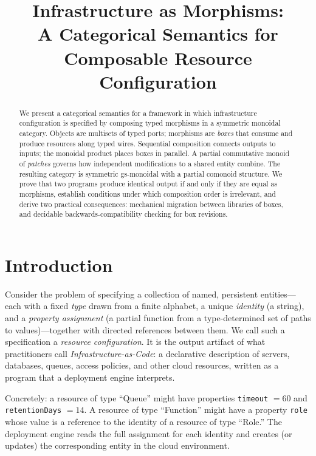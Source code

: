 \documentclass[11pt]{article}
\title{Infrastructure as Morphisms:\\A Categorical Semantics for Composable Resource Configuration}
\author{}
\date{}
\begin{document}
    \maketitle

    \begin{abstract}
        We present a categorical semantics for a framework in which infrastructure
        configuration is specified by composing typed morphisms in a symmetric monoidal
        category. Objects are multisets of typed ports; morphisms are \emph{boxes} that
        consume and produce resources along typed wires. Sequential composition connects
        outputs to inputs; the monoidal product places boxes in parallel. A partial
        commutative monoid of \emph{patches} governs how independent modifications to a
        shared entity combine. The resulting category is symmetric gs-monoidal with a
        partial comonoid structure.
        We prove that two programs produce identical output if and only if they are equal
        as morphisms, establish conditions under which composition order is irrelevant, and
        derive two practical consequences: mechanical migration between libraries of
        boxes, and decidable backwards-compatibility checking for box revisions.
    \end{abstract}

    \section{Introduction}

    Consider the problem of specifying a collection of named, persistent entities---each
    with a fixed \emph{type} drawn from a finite alphabet, a unique \emph{identity} (a
    string), and a \emph{property assignment} (a partial function from a type-determined
    set of paths to values)---together with directed references between them. We call such
    a specification a \emph{resource configuration}. It is the output artifact of what
    practitioners call \emph{Infrastructure-as-Code}: a declarative description of
    servers, databases, queues, access policies, and other cloud resources, written as a
    program that a deployment engine interprets.

    Concretely: a resource of type ``Queue'' might have properties \texttt{timeout} $= 60$
    and \texttt{retentionDays} $= 14$. A resource of type ``Function'' might have a property
    \texttt{role} whose value is a reference to the identity of a resource of type ``Role.''
    The deployment engine reads the full assignment for each identity and creates (or
    updates) the corresponding entity in the cloud environment.
\end{document}
